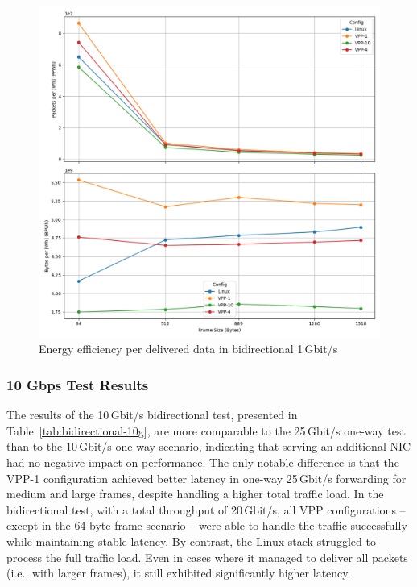 \begin{figure}[!htbp]
    \centering
    \includegraphics[width=\linewidth]{images/consumption-bi-1g.png}
    \caption{Energy efficiency per delivered data in bidirectional 1\,Gbit/s}
    \label{fig:bi-1g}
\end{figure}

\subsubsection{10 Gbps Test Results}

The results of the 10\,Gbit/s bidirectional test, presented in Table~\ref{tab:bidirectional-10g}, are more comparable to the 25\,Gbit/s one-way test than to the 10\,Gbit/s one-way scenario, 
indicating that serving an additional NIC had no negative impact on performance.  
The only notable difference is that the VPP-1 configuration achieved better latency in one-way 25\,Gbit/s forwarding for medium and large frames, despite handling a higher total traffic load.  
In the bidirectional test, with a total throughput of 20\,Gbit/s, all VPP configurations -- except in the 64-byte frame scenario -- 
were able to handle the traffic successfully while maintaining stable latency.  
By contrast, the Linux stack struggled to process the full traffic load. Even in cases where it managed to deliver all packets (i.e., with larger frames), it still exhibited significantly higher latency.

